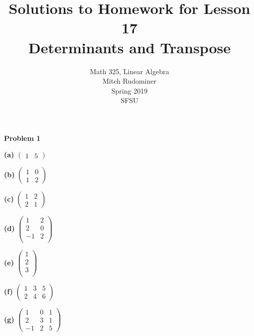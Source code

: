\documentclass[oneside,12pt]{amsart}
\begin{document}
\title{Solutions to Homework for Lesson 17 \\ Determinants and Transpose}
\author{Math 325, Linear Algebra \\ Mitch Rudominer \\ Spring 2019 \\ SFSU }
\date{}

\maketitle


\textbf{Problem 1}

\bigskip

\textbf{(a)}
$
\begin{pmatrix}
1 & 5
\end{pmatrix}
$

\bigskip

\textbf{(b)}
$
\begin{pmatrix}
1 & 0 \\
1 & 2
\end{pmatrix}
$

\bigskip

\textbf{(c)}
$
\begin{pmatrix}
1 & 2 \\
2 & 1
\end{pmatrix}
$

\bigskip

\textbf{(d)}
$
\begin{pmatrix}
1 & 2 \\
2 & 0 \\
-1 & 2 \\
\end{pmatrix}
$

\bigskip

\textbf{(e)}
$
\begin{pmatrix}
1 \\
2 \\
3 \\
\end{pmatrix}
$

\bigskip

\textbf{(f)}
$
\begin{pmatrix}
1 & 3 & 5 \\
2 & 4 & 6
\end{pmatrix}
$

\bigskip

\textbf{(g)}
$
\begin{pmatrix}
1 & 0 & 1 \\
2 & 3 & 1 \\
-1 & 2 & 5
\end{pmatrix}
$
\end{document}
